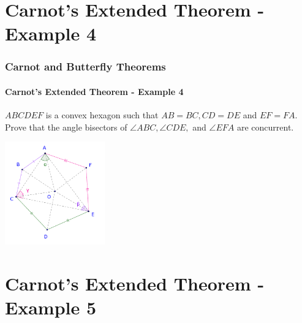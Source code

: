 \documentclass[8pt,xcolor=table,dvipsnames]{beamer}
\begin{document}
\section{Carnot's Extended Theorem - Example 4}

\begin{frame}[t]
    \frametitle{Carnot and Butterfly Theorems}
    \framesubtitle{Carnot's Extended Theorem - Example 4}
    \begin{example}
        $ABCDEF$ is a convex hexagon such that $AB=BC, CD=DE$ and $EF=FA.$
        Prove that the angle bisectors of $\angle ABC, \angle CDE,$ and $\angle EFA$ are concurrent.
    \end{example}
    \begin{center}
        \includegraphics[width=4.3cm]{./svg/pdf/24-25-s7-g3-p5.pdf}
    \end{center}
\end{frame}

\section{Carnot's Extended Theorem - Example 5}
\end{document}
